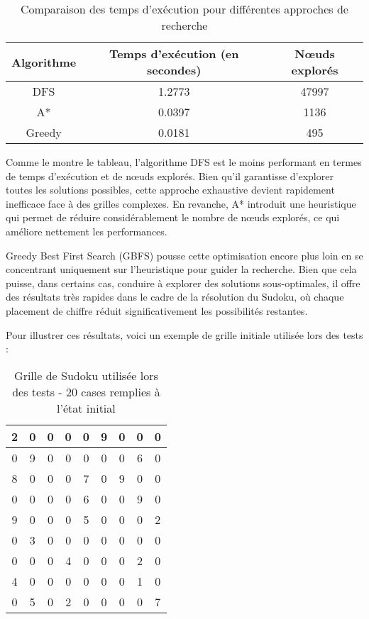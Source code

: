 \documentclass{article}
\begin{document}
\begin{table}[h]
\centering
\begin{tabular}{|c|c|c|}
\hline
\textbf{Algorithme} & \textbf{Temps d'exécution (en secondes)} & \textbf{Nœuds explorés} \\\hline
DFS                 & 1.2773                                   & 47997                    \\\hline
A*                  & 0.0397                                   & 1136                     \\\hline
Greedy              & 0.0181                                   & 495                      \\\hline
\end{tabular}
\caption{Comparaison des temps d'exécution pour différentes approches de recherche}
\end{table}

Comme le montre le tableau, l'algorithme DFS est le moins performant en termes de temps d'exécution et de nœuds explorés. Bien qu'il garantisse d'explorer toutes les solutions possibles, cette approche exhaustive devient rapidement inefficace face à des grilles complexes. En revanche, A* introduit une heuristique qui permet de réduire considérablement le nombre de nœuds explorés, ce qui améliore nettement les performances.

Greedy Best First Search (GBFS) pousse cette optimisation encore plus loin en se concentrant uniquement sur l'heuristique pour guider la recherche. Bien que cela puisse, dans certains cas, conduire à explorer des solutions sous-optimales, il offre des résultats très rapides dans le cadre de la résolution du Sudoku, où chaque placement de chiffre réduit significativement les possibilités restantes.

Pour illustrer ces résultats, voici un exemple de grille initiale utilisée lors des tests :

\begin{table}[H]
\centering
\begin{tabular}{|c|c|c||c|c|c||c|c|c|}
\hline
2 & 0 & 0 & 0 & 0 & 9 & 0 & 0 & 0 \\\hline
0 & 9 & 0 & 0 & 0 & 0 & 0 & 6 & 0 \\\hline
8 & 0 & 0 & 0 & 7 & 0 & 9 & 0 & 0 \\\hline
\hline
0 & 0 & 0 & 0 & 6 & 0 & 0 & 9 & 0 \\\hline
9 & 0 & 0 & 0 & 5 & 0 & 0 & 0 & 2 \\\hline
0 & 3 & 0 & 0 & 0 & 0 & 0 & 0 & 0 \\\hline
\hline
0 & 0 & 0 & 4 & 0 & 0 & 0 & 2 & 0 \\\hline
4 & 0 & 0 & 0 & 0 & 0 & 0 & 1 & 0 \\\hline
0 & 5 & 0 & 2 & 0 & 0 & 0 & 0 & 7 \\\hline
\end{tabular}
\caption{Grille de Sudoku utilisée lors des tests - 20 cases remplies à l'état initial}
\end{table}
\end{document}
